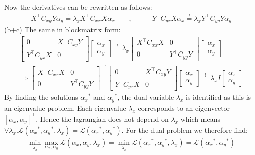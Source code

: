 \documentclass[a4paper]{article}
\newcommand{\eqq}{  \overset{\text{!}}{=} }
\newcommand{\Yt}{{Y^\top}}
\newcommand{\Xt}{{X^\top}}
\newcommand{\lx}{{\lambda_{x}}}
\newcommand{\ax}{{\alpha_{x}}}
\newcommand{\ay}{{\alpha_{y}}}
\newcommand{\Cxx}{C_{xx}}
\newcommand{\Cxy}{C_{xy}}
\newcommand{\Cyx}{C_{yx}}
\newcommand{\Cyy}{C_{yy}}
\newcommand{\1}{\mathds{1}}
\newcommand{\lag}{\mathcal{L}}
\begin{document}
Now the derivatives can be rewritten as follows:
\begin{align*}
	\Xt\Cxy Y\ay \eqq \lx\Xt\Cxx X\ax 
	\quad\quad ,&\quad\quad
	\Yt\Cyx X\ax \eqq \lx\Yt\Cyy Y\ay
\end{align*} 
(b+c) The same in blockmatrix form:
\begin{align*}
	\begin{bmatrix}
	0 & \Xt\Cxy Y  \\
	\Yt\Cyx X & 0 
	\end{bmatrix}
	\begin{bmatrix}
	 \ax  \\
	 \ay
	\end{bmatrix}
\eqq	 
	 \lx		
	\begin{bmatrix}
	\Xt\Cxx X & 0 \\
	0 & \Yt\Cyy Y  
	\end{bmatrix}
	\begin{bmatrix}
	 \ax  \\
	 \ay
	\end{bmatrix}
\\
\Longrightarrow
	\begin{bmatrix}
	\Xt\Cxx X & 0 \\
	0 & \Yt\Cyy Y  
	\end{bmatrix}^{-1}
	\begin{bmatrix}
	0 & \Xt\Cxy Y  \\
	\Yt\Cyx X & 0 
	\end{bmatrix}
	\begin{bmatrix}
	 \ax  \\
	 \ay
	\end{bmatrix}
\eqq	 
	 \lx		
	I
	\begin{bmatrix}
	 \ax  \\
	 \ay
	\end{bmatrix}
\end{align*}
By finding the solutions $\ax^*$ and $\ay^*$, the dual variable $\lx$
is identified as this is an eigenvalue problem. 
Each eigenvalue $\lx$ corresponds to an eigenvector $[\ax,\ay]^\top$. 
Hence the lagrangian does not depend on $\lx$ which means 
$\forall\lx . \lag(\ax^*,\ay^*,\lx) = \lag(\ax^*,\ay^*)$. 
For the dual problem we therefore find: 
\\     
\begin{align*}
	\min_\lx \max_{\ax,\ay} \lag(\ax,\ay,\lx) = \min_\lx \lag(\ax^*,\ay^*,\lx) = \lag(\ax^*,\ay^*)
\end{align*} 
\end{document}
